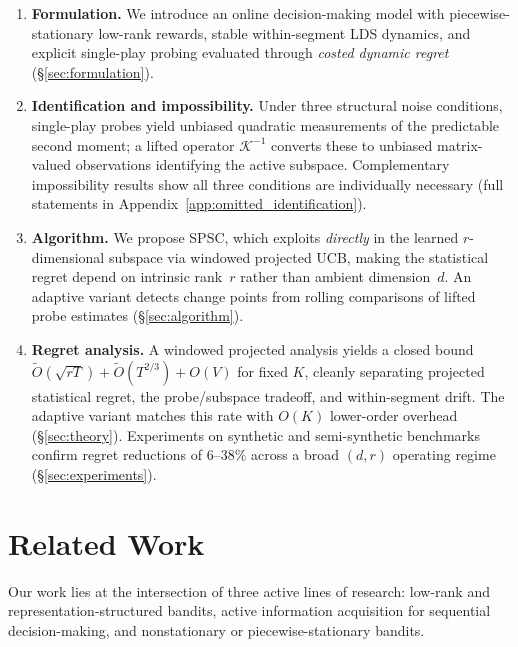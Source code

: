 \documentclass{article}
\begin{document}
\begin{enumerate}[leftmargin=1.5em, itemsep=2pt]
\item \textbf{Formulation.} We introduce an online decision-making model with piecewise-stationary low-rank rewards, stable within-segment LDS dynamics, and explicit single-play probing evaluated through \emph{costed dynamic regret} (\S\ref{sec:formulation}).

\item \textbf{Identification and impossibility.} Under three structural noise conditions, single-play probes yield unbiased quadratic measurements of the predictable second moment; a lifted operator $\mathcal{K}^{-1}$ converts these to unbiased matrix-valued observations identifying the active subspace.
Complementary impossibility results show all three conditions are individually necessary (full statements in Appendix~\ref{app:omitted_identification}).

\item \textbf{Algorithm.} We propose SPSC, which exploits \emph{directly} in the learned $r$-dimensional subspace via windowed projected UCB, making the statistical regret depend on intrinsic rank~$r$ rather than ambient dimension~$d$.
An adaptive variant detects change points from rolling comparisons of lifted probe estimates (\S\ref{sec:algorithm}).

\item \textbf{Regret analysis.} A windowed projected analysis yields a closed bound $\widetilde{O}(\sqrt{rT}) + \widetilde{O}(T^{2/3}) + O(V)$ for fixed $K$, cleanly separating projected statistical regret, the probe/subspace tradeoff, and within-segment drift.
The adaptive variant matches this rate with $O(K)$ lower-order overhead (\S\ref{sec:theory}).
Experiments on synthetic and semi-synthetic benchmarks confirm regret reductions of 6--38\% across a broad $(d,r)$ operating regime (\S\ref{sec:experiments}).
\end{enumerate}

\section{Related Work}
\label{sec:related}

Our work lies at the intersection of three active lines of research: low-rank and representation-structured bandits, active information acquisition for sequential decision-making, and nonstationary or piecewise-stationary bandits.
\end{document}
